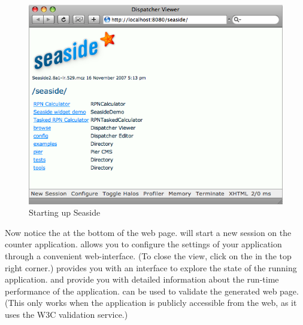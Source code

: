 \documentclass[a4paper,10pt,twoside]{book}
\begin{document}
\begin{figure}[ht]
\begin{center}
\includegraphics[width=\textwidth]{seasideStartup}
\caption{Starting up Seaside}
\label{fig:seasideStartup}
\end{center}
\end{figure}


Now notice the  at the bottom of the web page.
 will start a new session on the counter application.
 allows you to configure the settings of your application through a convenient web-interface.
(To close the  view, click on the  in the top right corner.)
 provides you with an interface to explore the state of the running application.
 and  provide you with detailed information about the run-time performance of the application.
 can be used to validate the generated web page.
(This only works when the application is publicly accessible from the web, as it uses the W3C validation service.)
\end{document}

